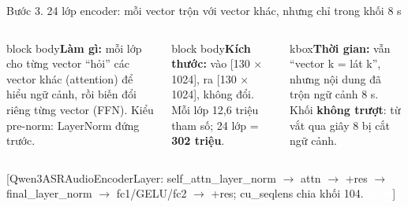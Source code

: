 \documentclass[aspectratio=169,xcolor=table]{beamer}
\newcommand{\bad}[1]{\textcolor{RiskRed}{\textbf{#1}}}
\newcommand{\src}[1]{\par\vfill{\tiny\color{TextGray}[#1]}}
\newcommand{\ra}{$\rightarrow$}
\newcommand{\bsz}{\footnotesize}%
\newcommand{\nbox}[2][block body]{\begin{beamercolorbox}[sep=0.45em,rounded=true]{#1}\bsz #2\end{beamercolorbox}}
\newcommand{\tagbox}[2]{{\scriptsize\colorbox{#1}{\textcolor{white}{\textbf{#2}}}}}
\newcommand{\CODE}{\tagbox{Secondary}{code}}
\begin{document}
\begin{frame}{Bước 3. 24 lớp encoder: mỗi vector trộn với vector khác, nhưng chỉ trong khối 8 s}
\begin{columns}[T]
\begin{tikzpicture}[font=\tiny]
\end{tikzpicture}
\end{columns}
\vspace{0.1cm}
\begin{columns}[T]
\nbox{\textbf{Làm gì:} mỗi lớp cho từng vector ``hỏi'' các vector khác (attention) để hiểu ngữ cảnh, rồi biến đổi riêng từng vector (FFN). Kiểu pre-norm: LayerNorm đứng trước.}
\nbox{\textbf{Kích thước:} vào [130 $\times$ 1024], ra [130 $\times$ 1024], không đổi. Mỗi lớp 12,6 triệu tham số; 24 lớp = \textbf{302 triệu}.}
\nbox[kbox]{\textbf{Thời gian:} vẫn ``vector k = lát k'', nhưng nội dung đã trộn ngữ cảnh 8 s. Khối \bad{không trượt}: từ vắt qua giây 8 bị cắt ngữ cảnh.}
\end{columns}
\src{Qwen3ASRAudioEncoderLayer: self\_attn\_layer\_norm \ra{} attn \ra{} +res \ra{} final\_layer\_norm \ra{} fc1/GELU/fc2 \ra{} +res; cu\_seqlens chia khối 104. \CODE}
\end{frame}
\end{document}
